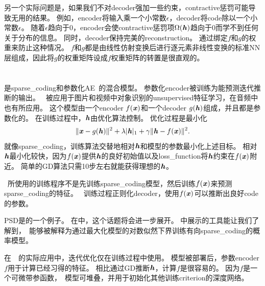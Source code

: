 另一个实际问题是，如果我们不对\gls{decoder}强加一些约束，\gls{contractive}惩罚可能导致无用的结果。
例如，\gls{encoder}将输入乘一个小常数$\epsilon$，\gls{decoder}将\gls{code}除以一个小常数$\epsilon$。
随着$\epsilon$趋向于0，\gls{encoder}会使\gls{contractive}惩罚项$\Omega(\boldsymbol{\mathit{h}})$趋向于0而学不到任何关于分布的信息。
同时，\gls{decoder}保持完美的\gls{reconstruction}。
\citet{Rifai+al-2011-small}通过绑定$f$和$g$的权重来防止这种情况。
$f$和$g$都是由线性仿射变换后进行逐元素非线性变换的标准\gls{NN}层组成，因此将$g$的权重矩阵设成$f$权重矩阵的转置是很直观的。


\section{}
\label{sec:predictive_sparse_decomposition}

是\gls{sparse_coding}和参数化\gls{AE}~\citep{koray-psd-08}的混合模型。
参数化\gls{encoder}被训练为能预测迭代推断的输出。
~被应用于图片和视频中对象识别的\gls{unsupervised}特征学习\citep{Koray-08-small,koray-nips-10-small,Jarrett-ICCV2009-small,farabet-suml-11}，在音频中也有所应用\citep{henaff-ismir-11-small}。
这个模型由一个\gls{encoder} $f(\boldsymbol{\mathit{x}})$和一个\gls{decoder} $g(\boldsymbol{\mathit{h}})$组成，并且都是参数化的。
在训练过程中，$\boldsymbol{\mathit{h}}$由优化算法控制。
优化过程是最小化
\begin{align}
 \| \boldsymbol{\mathit{x}} - g(\boldsymbol{\mathit{h}}) \| ^2 + \lambda | \boldsymbol{\mathit{h}} |_1 + \gamma \| \boldsymbol{\mathit{h}} - f(\boldsymbol{\mathit{x}}) \|^2.
\end{align}
就像\gls{sparse_coding}，训练算法交替地相对$\boldsymbol{\mathit{h}}$和模型的参数最小化上述目标。
相对$\boldsymbol{\mathit{h}}$最小化较快，因为$f(\boldsymbol{\mathit{x}})$提供$\boldsymbol{\mathit{h}}$的良好初始值以及\gls{loss_function}将$\boldsymbol{\mathit{h}}$约束在$f(\boldsymbol{\mathit{x}})$附近。
简单的\gls{GD}算法只需10步左右就能获得理想的$\boldsymbol{\mathit{h}}$。


~所使用的训练程序不是先训练\gls{sparse_coding}模型，然后训练$f(\boldsymbol{\mathit{x}})$来预测\gls{sparse_coding}的特征。
~训练过程正则化\gls{decoder}，使用$f(\boldsymbol{\mathit{x}})$可以推断出良好\gls{code}的参数。


\gls{PSD}是的一个例子。
在中，这个话题将会进一步展开。
中展示的工具能让我们了解到，~能够被解释为通过最大化模型的对数似然下界训练有向\gls{sparse_coding}的概率模型。


在~~的实际应用中，迭代优化仅在训练过程中使用。
模型被部署后，参数\gls{encoder} $f$用于计算已经习得的特征。
相比通过\gls{GD}推断$\boldsymbol{\mathit{h}}$，计算$f$是很容易的。
因为$f$是一个可微带参函数，~模型可堆叠，并用于初始化其他训练\gls{criterion}的深度网络。

